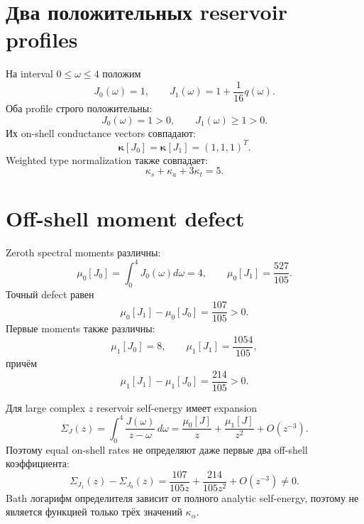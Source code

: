 \section{Два положительных reservoir profiles}

На interval $0\leq\omega\leq4$ положим
\begin{equation}
 J_0(\omega)=1,
 \qquad
 J_1(\omega)=1+\frac1{16}q(\omega).
 \label{eq:v9-kms-reservoir-two-profiles}
\end{equation}
Оба profile строго положительны:
\begin{equation}
 J_0(\omega)=1>0,
 \qquad J_1(\omega)\geq1>0.
 \label{eq:v9-kms-reservoir-positivity}
\end{equation}
Их on-shell conductance vectors совпадают:
\begin{equation}
 \boldsymbol\kappa[J_0]
 =\boldsymbol\kappa[J_1]
 =(1,1,1)^T.
 \label{eq:v9-kms-reservoir-equal-rates}
\end{equation}
Weighted type normalization также совпадает:
\begin{equation}
 \kappa_s+\kappa_a+3\kappa_t=5.
 \label{eq:v9-kms-reservoir-equal-normalization}
\end{equation}

\section{Off-shell moment defect}

Zeroth spectral moments различны:
\begin{equation}
 \mu_0[J_0]=\int_0^4J_0(\omega)d\omega=4,
 \qquad
 \mu_0[J_1]=\frac{527}{105}.
 \label{eq:v9-kms-reservoir-zeroth-moments}
\end{equation}
Точный defect равен
\begin{equation}
 \mu_0[J_1]-\mu_0[J_0]=\frac{107}{105}>0.
 \label{eq:v9-kms-reservoir-zeroth-defect}
\end{equation}
Первые moments также различны:
\begin{equation}
 \mu_1[J_0]=8,
 \qquad
 \mu_1[J_1]=\frac{1054}{105},
 \label{eq:v9-kms-reservoir-first-moments}
\end{equation}
причём
\begin{equation}
 \mu_1[J_1]-\mu_1[J_0]=\frac{214}{105}>0.
 \label{eq:v9-kms-reservoir-first-defect}
\end{equation}

Для large complex $z$ reservoir self-energy имеет expansion
\begin{equation}
 \Sigma_J(z)=\int_0^4\frac{J(\omega)}{z-\omega}\,d\omega
 =\frac{\mu_0[J]}{z}+\frac{\mu_1[J]}{z^2}+O(z^{-3}).
 \label{eq:v9-kms-reservoir-self-energy-expansion}
\end{equation}
Поэтому equal on-shell rates не определяют даже первые два off-shell
коэффициента:
\begin{equation}
 \Sigma_{J_1}(z)-\Sigma_{J_0}(z)
 =\frac{107}{105z}+\frac{214}{105z^2}+O(z^{-3})\neq0.
 \label{eq:v9-kms-reservoir-self-energy-defect}
\end{equation}
Bath логарифм определителя зависит от полного analytic self-energy, поэтому не является
функцией только трёх значений $\kappa_\alpha$.


